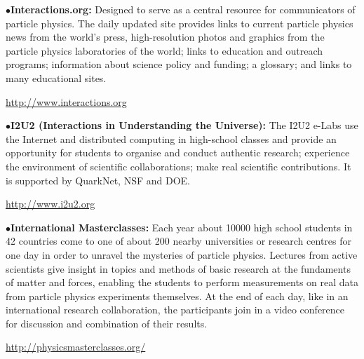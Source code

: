 \medskip

\item{$\bullet$}{\bf Interactions.org:}
Designed to serve as a central resource for communicators of particle physics. The daily updated site provides links to current particle physics news from the world's press, high-resolution photos and graphics from the particle physics laboratories of the world; links to education and outreach programs; information about science policy and funding; a glossary; and links to many educational sites.
	\item{}\qquad\url{http://www.interactions.org}

\medskip

\item{$\bullet$}{\bf I2U2 (Interactions in Understanding the Universe):}
The I2U2 e-Labs use the Internet and distributed computing in high-school classes and provide an opportunity for students to organise and conduct authentic research; experience the environment of scientific collaborations; make real scientific contributions. It is supported by QuarkNet, NSF and DOE.
	\item{}\qquad\url{http://www.i2u2.org}


\medskip
\medskip









\medskip

\item{$\bullet$}{\bf International Masterclasses:}
Each year about 10000 high school students in 42 countries come to one of about 200 nearby universities or research centres for one day in order to unravel the mysteries of particle physics. Lectures from active scientists give insight in topics and methods of basic research at the fundaments of matter and forces, enabling the students to perform measurements on real data from particle physics experiments themselves. At the end of each day, like in an international research collaboration, the participants join in a video conference for discussion and combination of their results.
	\item{}\qquad\url{http://physicsmasterclasses.org/}

